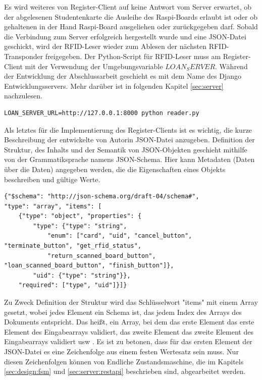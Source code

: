 Es wird weiteres von Register-Client auf keine Antwort vom Server erwartet, ob der abgelesenen Studentenkarte die Ausleihe des Raspi-Boards erlaubt ist oder ob gehaltenen in der Hand Raspi-Board ausgeliehen oder zurückgegeben darf. Sobald die Verbindung zum Server erfolgreich hergestellt wurde und eine JSON-Datei geschickt, wird der RFID-Leser wieder zum Ablesen der nächsten RFID-Transponder freigegeben. Der Python-Script für RFID-Leser muss am Register-Client mit der Verwendung der Umgebungsvariable $LOAN_SERVER$. Während der Entwicklung der Abschlussarbeit geschieht es mit dem Name des Django Entwicklungsservers. Mehr darüber ist in folgenden Kapitel \ref{sec:server} nachzulesen.
\begin{lstlisting}[caption={[Umgebungsvariable für den Serverstart] },captionpos=b]
LOAN_SERVER_URL=http://127.0.0.1:8000 python reader.py
\end{lstlisting}
Als letztes für die Implementierung des Register-Clients ist es wichtig, die kurze Beschreibung der entwickelte von Autorin JSON-Datei anzugeben. Definition der Struktur, des Inhalts und der Semantik von JSON-Objekten geschieht mithilfe von der Grammatiksprache namens JSON-Schema. Hier kann Metadaten (Daten über die Daten) angegeben werden, die die Eigenschaften eines Objekts beschreiben und gültige Werte. 

\begin{lstlisting}[caption={JSON-Schema},captionpos=b]
{"$schema": "http://json-schema.org/draft-04/schema#",
"type": "array", "items": [
	{"type": "object", "properties": {
		"type": {"type": "string",
			"enum": ["card", "uid", "cancel_button", "terminate_button", "get_rfid_status",
			"return_scanned_board_button", "loan_scanned_board_button", "finish_button"]},
		"uid": {"type": "string"}},
	"required": ["type", "uid"]}]}
\end{lstlisting}

Zu Zweck Definition der Struktur wird das Schlüsselwort "items" mit einem Array gesetzt, wobei jedes Element ein Schema ist, das jedem Index des Arrays des Dokuments entspricht. Das heißt, ein Array, bei dem das erste Element das erste Element des Eingabearrays validiert, das zweite Element das zweite Element des Eingabearrays validiert usw \cite{website:14}. Es ist zu betonen, dass für das ersten Element der JSON-Datei es eine Zeichenfolge aus einem festen Wertesatz sein muss. Nur diesen Zeichenfolgen können von Endliche Zustandsmaschine, die im Kapitels \ref{sec:design:fsm} und \ref{sec:server:restapi} beschrieben sind, abgearbeitet werden. 

